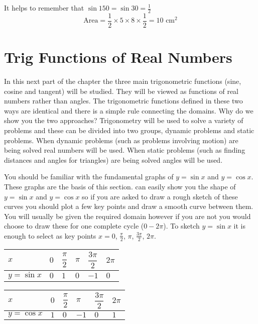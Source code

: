 It helps to remember that $\sin  150 =\sin  30 =\frac{1}{2}$
\begin{equation*}\text{Area} =\frac{1}{2} \times 5 \times 8 \times \frac{1}{2} =10 \text{ cm}^{2}
\end{equation*}

\section{Trig Functions of Real Numbers}
In this next part of the chapter the three main trigonometric functions (sine, cosine and tangent) will be studied. They will be viewed as functions of real numbers rather than angles. The trigonometric functions defined in these two ways are identical and there is a simple rule connecting the domains. Why do we show you the two approaches? Trigonometry will be used to solve a variety of problems and these can be divided into two groups, dynamic problems and static problems. When dynamic problems (such as problems involving motion) are being solved real numbers will be used. When static problems (such as finding distances and angles for triangles) are being solved angles will be used. 

You should be familiar with the fundamental graphs of $y =\sin  x$ and $y =\cos  x$. These graphs are the basis of this section. \Desmos can easily show you the shape of $y =\sin  x$ and $y =\cos  x$ so if you are asked to draw a rough sketch of these curves you should plot a few key points and draw a smooth curve between them. You will usually be given the required domain however if you are not you would choose to draw these for one complete cycle ($0 -2 \pi $). To sketch $y =\sin  x$ it is enough to select as key points $x =0$, $\frac{\pi }{2}$, $\pi $, $\frac{3 \pi }{2}$, $2 \pi $. 

\begin{center}
\begin{tabular}{llllll}\toprule
	$x$  & $0$  & $\dfrac{\pi }{2}$  & $\pi $  & $\dfrac{3 \pi }{2}$  & $2 \pi $ \\\midrule
	$y =\sin  x$  & $0$  & $1$  & $0$  & $ -1$  & $0$  \\\bottomrule
\end{tabular}
\hspace{1cm}
\begin{tabular}[c]{llllll}\toprule
	$x$  & $0$  & $\dfrac{\pi }{2}$  & $\pi $  & $\dfrac{3 \pi }{2}$  & $2 \pi $ \\\midrule
	$y =\cos  x$  & $1$  & $0$  & $ -1$  & $0$  & $1$ \\\bottomrule
\end{tabular}
\end{center}


